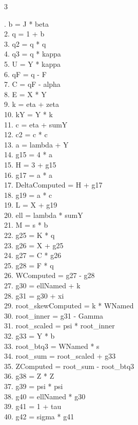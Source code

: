 \documentclass[10pt]{article}
\begin{document}
\begin{multicols}{3}
\raggedright\ttfamily\fontsize{6.2}{7.1}. b = J * beta\\
2. q = 1 + b\\
3. q2 = q * q\\
4. q3 = q * kappa\\
5. U = Y * kappa\\
6. qF = q - F\\
7. C = qF - alpha\\
8. E = X * Y\\
9. k = eta + zeta\\
10. kY = Y * k\\
11. c = eta + sumY\\
12. c2 = c * c\\
13. a = lambda + Y\\
14. g15 = 4 * a\\
15. H = 3 + g15\\
16. g17 = a * a\\
17. DeltaComputed = H + g17\\
18. g19 = a * c\\
19. L = X + g19\\
20. ell = lambda * sumY\\
21. M = s * b\\
22. g25 = K * q\\
23. g26 = X + g25\\
24. g27 = C * g26\\
25. g28 = F * q\\
26. WComputed = g27 - g28\\
27. g30 = ellNamed + k\\
28. g31 = g30 + xi\\
29. root\_skewComputed = k * WNamed\\
30. root\_inner = g31 - Gamma\\
31. root\_scaled = psi * root\_inner\\
32. g33 = Y * b\\
33. root\_btq3 = WNamed * s\\
34. root\_sum = root\_scaled + g33\\
35. ZComputed = root\_sum - root\_btq3\\
36. g38 = Z * Z\\
37. g39 = psi * psi\\
38. g40 = ellNamed * g30\\
39. g41 = 1 + tau\\
40. g42 = sigma * g41\\

\end{multicols}
\end{document}
